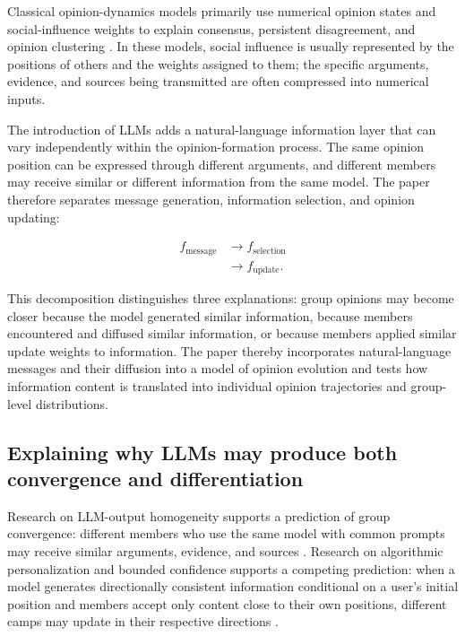 \documentclass[11pt,a4paper]{article}
\begin{document}
Classical opinion-dynamics models primarily use numerical opinion states and social-influence weights to explain consensus, persistent disagreement, and opinion clustering \cite{degroot1974,friedkin1990,hegselmann2002}. In these models, social influence is usually represented by the positions of others and the weights assigned to them; the specific arguments, evidence, and sources being transmitted are often compressed into numerical inputs.

The introduction of LLMs adds a natural-language information layer that can vary independently within the opinion-formation process. The same opinion position can be expressed through different arguments, and different members may receive similar or different information from the same model. The paper therefore separates message generation, information selection, and opinion updating:

\begin{equation*}
\begin{aligned}f_{\text{message}} &\rightarrow f_{\text{selection}} \\
&\rightarrow f_{\text{update}}.\end{aligned}
\end{equation*}

This decomposition distinguishes three explanations: group opinions may become closer because the model generated similar information, because members encountered and diffused similar information, or because members applied similar update weights to information. The paper thereby incorporates natural-language messages and their diffusion into a model of opinion evolution and tests how information content is translated into individual opinion trajectories and group-level distributions.

\subsection{Explaining why LLMs may produce both convergence and differentiation}

Research on LLM-output homogeneity supports a prediction of group convergence: different members who use the same model with common prompts may receive similar arguments, evidence, and sources \cite{jiang2025}. Research on algorithmic personalization and bounded confidence supports a competing prediction: when a model generates directionally consistent information conditional on a user's initial position and members accept only content close to their own positions, different camps may update in their respective directions \cite{perra2019,hegselmann2002}.
\end{document}
